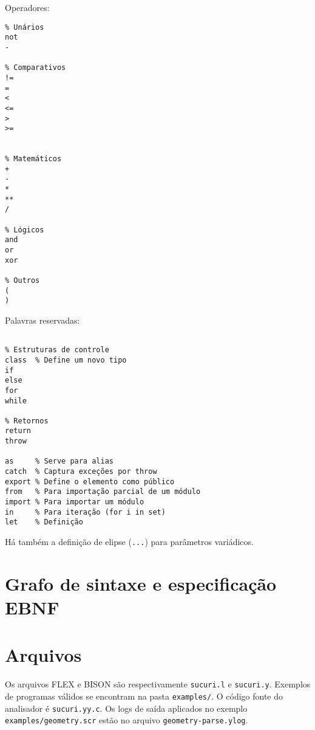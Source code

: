 \documentclass[headings=standardclasses, headings=big]{scrreprt}
\begin{document}
Operadores:

\begin{verbatim}
% Unários
not
-

% Comparativos
!=
=
<
<=
>
>=


% Matemáticos
+
-
*
**
/

% Lógicos
and
or
xor

% Outros
(
)

\end{verbatim}

Palavras reservadas:

\begin{verbatim}

% Estruturas de controle
class  % Define um novo tipo
if
else
for
while

% Retornos
return
throw

as     % Serve para alias
catch  % Captura exceções por throw
export % Define o elemento como público
from   % Para importação parcial de um módulo
import % Para importar um módulo
in     % Para iteração (for i in set)
let    % Definição
\end{verbatim}

Há também a definição de elipse (\texttt{...}) para parâmetros variádicos.

\clearpage

\section{Grafo de sintaxe e especificação EBNF}



\clearpage

\section{Arquivos}

Os arquivos FLEX e BISON são respectivamente \texttt{sucuri.l} e
\texttt{sucuri.y}. Exemplos de programas válidos se encontram na pasta
\texttt{examples/}. O código fonte do analisador é \texttt{sucuri.yy.c}.  Os
logs de saída aplicados no exemplo \texttt{examples/geometry.scr} estão no
arquivo \texttt{geometry-parse.ylog}.
\end{document}
